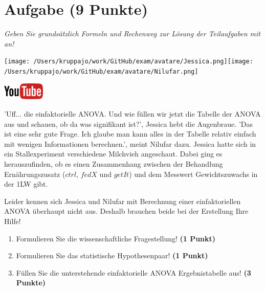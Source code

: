\documentclass[a4paper, 9pt]{scrartcl}\usepackage[]{graphicx}\usepackage[]{xcolor}
\begin{document}
\clearpage

\section{Aufgabe \hfill (9 Punkte)}

\textit{Geben Sie grundsätzlich Formeln und Rechenweg zur Lösung der Teilaufgaben mit an!} \\[1Ex]
 

 
\begin{minipage}[t]{0.5\textwidth}
\texttt{[image: /Users/kruppajo/work/GitHub/exam/avatare/Jessica.png]}\hspace{-4mm}\texttt{[image: /Users/kruppajo/work/GitHub/exam/avatare/Nilufar.png]}
\end{minipage}
\begin{minipage}[t]{0.5\textwidth}
\hfill
\href{https://youtu.be/IhecxMcCENY}{\includegraphics[width = 2cm]{img/youtube}}
\end{minipage}
\vspace{1ex}



'Uff... die einfaktorielle ANOVA. Und wie füllen wir jetzt die Tabelle der ANOVA aus und schauen, ob da was signifikant ist?', Jessica hebt die Augenbraue. 'Das ist eine sehr gute Frage. Ich glaube man kann alles in der Tabelle relativ einfach mit wenigen Informationen berechnen.', meint Nilufar dazu. Jessica hatte sich in ein Stallexperiment verschiedene Milchvieh angeschaut. Dabei ging es herauszufinden, ob es einen Zusammenhang zwischen der Behandlung Ernährungszusatz ($ctrl$, $fedX$ und $getIt$) und dem Messwert Gewichtszuwachs in der 1LW gibt.



\vspace{1ex}

Leider kennen sich Jessica und Nilufar mit Berechnung einer einfaktoriellen ANOVA überhaupt nicht aus. Deshalb brauchen beide bei der Erstellung Ihre Hilfe! 

\begin{enumerate}
  \item Formulieren Sie die wissenschaftliche Fragestellung! \textbf{(1 Punkt)}
  \item Formulieren Sie das statistische Hypothesenpaar! \textbf{(1 Punkt)}
\item Füllen Sie die unterstehende einfaktorielle ANOVA Ergebnistabelle aus! \textbf{(3 Punkte)}
\end{enumerate}
\end{document}
